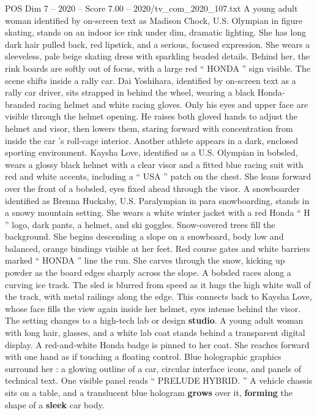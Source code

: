\begin{textsample}{POS Dim 7 – 2020 – Score 7.00 – 2020/tv\_com\_2020\_107.txt}  \label{ex:f7_pos_086}
A young adult woman identified by on-screen text as Madison Chock, U.S.
Olympian in figure skating, stands on an indoor ice rink under dim, dramatic lighting.
She has long dark hair pulled back, red lipstick, and a serious, focused expression.
She wears a sleeveless, pale beige skating dress with sparkling beaded details.
Behind her, the rink boards are softly out of focus, with a large red “ HONDA ” sign visible.
The scene shifts inside a rally car.
Dai Yoshihara, identified by on-screen text as a rally car driver, sits strapped in behind the wheel, wearing a black Honda-branded racing helmet and white racing gloves.
Only his eyes and upper face are visible through the helmet opening.
He raises both gloved hands to adjust the helmet and visor, then lowers them, staring forward with concentration from inside the car ’s roll-cage interior.
Another athlete appears in a dark, enclosed sporting environment.
Kaysha Love, identified as a U.S.
Olympian in bobsled, wears a glossy black helmet with a clear visor and a fitted blue racing suit with red and white accents, including a “ USA ” patch on the chest.
She leans forward over the front of a bobsled, eyes fixed ahead through the visor.
A snowboarder identified as Brenna Huckaby, U.S.
Paralympian in para snowboarding, stands in a snowy mountain setting.
She wears a white winter jacket with a red Honda “ H ” logo, dark pants, a helmet, and ski goggles.
Snow-covered trees fill the background.
She begins descending a slope on a snowboard, body low and balanced, orange bindings visible at her feet.
Red course gates and white barriers marked “ HONDA ” line the run.
She carves through the snow, kicking up powder as the board edges sharply across the slope.
A bobsled races along a curving ice track.
The sled is blurred from speed as it hugs the high white wall of the track, with metal railings along the edge.
This connects back to Kaysha Love, whose face fills the view again inside her helmet, eyes intense behind the visor.
The setting changes to a high-tech lab or design \textbf{studio}.
A young adult woman with long hair, glasses, and a white lab coat stands behind a transparent digital display.
A red-and-white Honda badge is pinned to her coat.
She reaches forward with one hand as if touching a floating control.
Blue holographic graphics surround her : a glowing outline of a car, circular interface icons, and panels of technical text.
One visible panel reads “ PRELUDE HYBRID. ” A vehicle chassis sits on a table, and a translucent blue hologram \textbf{grows} over it, \textbf{forming} the shape of a \textbf{sleek} car body.

\end{textsample}
